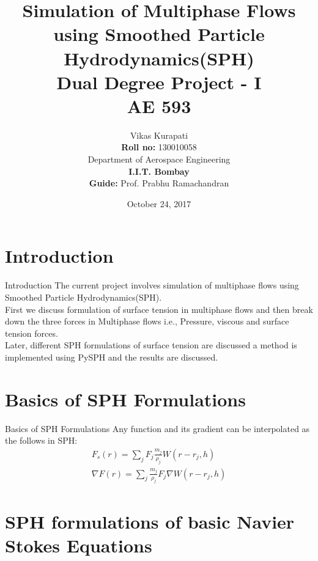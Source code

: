 \documentclass{beamer}
\title[Multiphase SPH]{\textbf{Simulation of Multiphase Flows using Smoothed Particle Hydrodynamics(SPH)}\\[0.1in]
		Dual Degree Project - I\\
		\textbf{AE 593}}
\author[Vikas K]{Vikas Kurapati \\ 
		\textbf{Roll no:} 130010058 \\
		Department of Aerospace Engineering\\
		\textbf{I.I.T. Bombay}\\[0.1in]
		\textbf{Guide:} Prof. Prabhu Ramachandran}
\date{October 24, 2017}
\begin{document}
\begin{frame}
\maketitle
\end{frame}


\section{Introduction}

\begin{frame}{Introduction}
\justifying
The current project involves simulation of multiphase flows using Smoothed Particle Hydrodynamics(SPH).\\[0.2in] 
First we discuss formulation of surface tension in multiphase flows and then break down the three forces in Multiphase flows i.e., Pressure, viscous and surface tension forces.\\[0.2in] 
Later, different SPH formulations of surface tension are discussed a method is implemented using PySPH and the results are discussed.
\end{frame}

\section{Basics of SPH Formulations}
\begin{frame}{Basics of SPH Formulations}
\justifying
Any function and its gradient can be interpolated as the follows in SPH:
\begin{eqnarray*}
F_s (r) = \sum_{j} F_j \frac{m_j}{\rho_j} W(r-r_j, h) \\
\nabla F(r) = \sum_j \frac{m_j}{\rho_j}F_j \nabla W(r-r_j, h)
\end{eqnarray*}
\end{frame}
\section{SPH formulations of basic Navier Stokes Equations}
\end{document}
